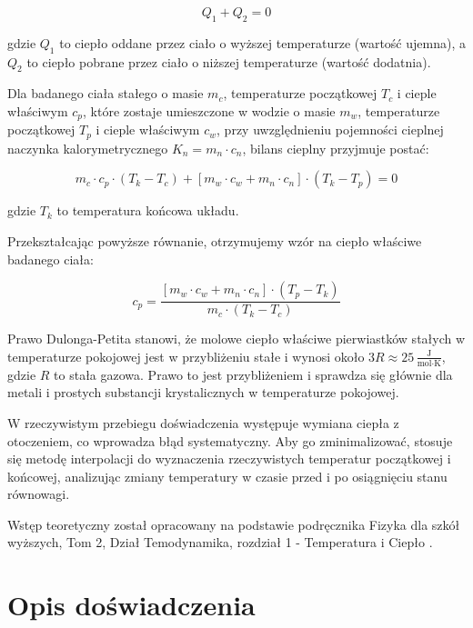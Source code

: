 \documentclass[a4paper,12pt]{article}
\begin{document}
\begin{equation}
    Q_1 + Q_2 = 0
\end{equation}

gdzie $Q_1$ to ciepło oddane przez ciało o wyższej temperaturze (wartość ujemna), a $Q_2$ to ciepło pobrane przez ciało o niższej temperaturze (wartość dodatnia).

Dla badanego ciała stałego o masie $m_c$, temperaturze początkowej $T_c$ i cieple właściwym $c_p$, które zostaje umieszczone w wodzie o masie $m_w$, temperaturze początkowej $T_p$ i cieple właściwym $c_w$, przy uwzględnieniu pojemności cieplnej naczynka kalorymetrycznego $K_n = m_n \cdot c_n$, bilans cieplny przyjmuje postać:

\begin{equation}
    m_c \cdot c_p \cdot (T_k - T_c) + [m_w \cdot c_w + m_n \cdot c_n] \cdot (T_k - T_p) = 0
\end{equation}

gdzie $T_k$ to temperatura końcowa układu.

Przekształcając powyższe równanie, otrzymujemy wzór na ciepło właściwe badanego ciała:

\begin{equation}
    c_p = \frac{[m_w \cdot c_w + m_n \cdot c_n] \cdot (T_p - T_k)}{m_c \cdot (T_k - T_c)}
    \label{eq:cieplo_wlasciwe}
\end{equation}

Prawo Dulonga-Petita stanowi, że molowe ciepło właściwe pierwiastków stałych w temperaturze pokojowej jest w przybliżeniu stałe i wynosi około $3R \approx 25\,\frac{\text{J}}{\text{mol} \cdot \text{K}}$, gdzie $R$ to stała gazowa. Prawo to jest przybliżeniem i sprawdza się głównie dla metali i prostych substancji krystalicznych w temperaturze pokojowej.

W rzeczywistym przebiegu doświadczenia występuje wymiana ciepła z otoczeniem, co wprowadza błąd systematyczny. Aby go zminimalizować, stosuje się metodę interpolacji do wyznaczenia rzeczywistych temperatur początkowej i końcowej, analizując zmiany temperatury w czasie przed i po osiągnięciu stanu równowagi.

Wstęp teoretyczny został opracowany na podstawie podręcznika Fizyka dla szkół wyższych, Tom 2, Dział Temodynamika, rozdział 1 - Temperatura i Ciepło \cite{fizyka_dla_szkół_wyższych_tom_2}.




\section{Opis doświadczenia}
\end{document}
